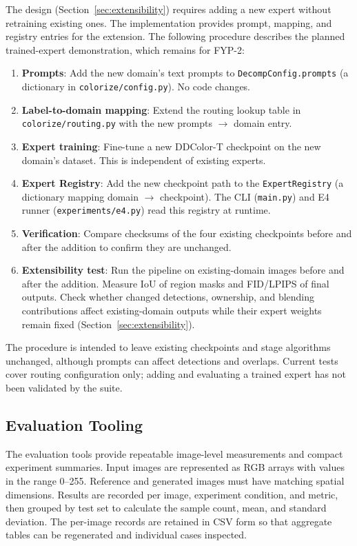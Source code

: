 \documentclass{FastFyp}
\begin{document}
The design (Section~\ref{sec:extensibility}) requires adding a new expert without retraining existing ones. The implementation provides prompt, mapping, and registry entries for the extension. The following procedure describes the planned trained-expert demonstration, which remains for FYP-2:

\begin{enumerate}
    \item \textbf{Prompts}: Add the new domain's text prompts to \texttt{DecompConfig.prompts} (a dictionary in \texttt{colorize/config.py}). No code changes.
    \item \textbf{Label-to-domain mapping}: Extend the routing lookup table in \texttt{colorize/routing.py} with the new prompts $\to$ domain entry.
    \item \textbf{Expert training}: Fine-tune a new DDColor-T checkpoint on the new domain's dataset. This is independent of existing experts.
    \item \textbf{Expert Registry}: Add the new checkpoint path to the \texttt{ExpertRegistry} (a dictionary mapping domain $\to$ checkpoint). The CLI (\texttt{main.py}) and E4 runner (\texttt{experiments/e4.py}) read this registry at runtime.
    \item \textbf{Verification}: Compare checksums of the four existing checkpoints before and after the addition to confirm they are unchanged.
    \item \textbf{Extensibility test}: Run the pipeline on existing-domain images before and after the addition. Measure IoU of region masks and FID/LPIPS of final outputs. Check whether changed detections, ownership, and blending contributions affect existing-domain outputs while their expert weights remain fixed (Section~\ref{sec:extensibility}).
\end{enumerate}
The procedure is intended to leave existing checkpoints and stage algorithms unchanged, although prompts can affect detections and overlaps. Current tests cover routing configuration only; adding and evaluating a trained expert has not been validated by the suite.

\subsection{Evaluation Tooling}
\label{subsec:evaluation-tooling}

The evaluation tools provide repeatable image-level measurements and compact
experiment summaries. Input images are represented as RGB arrays with values
in the range 0--255. Reference and generated images must have matching spatial
dimensions. Results are recorded per image, experiment condition, and metric,
then grouped by test set to calculate the sample count, mean, and standard
deviation. The per-image records are retained in CSV form so that aggregate
tables can be regenerated and individual cases inspected.
\end{document}
